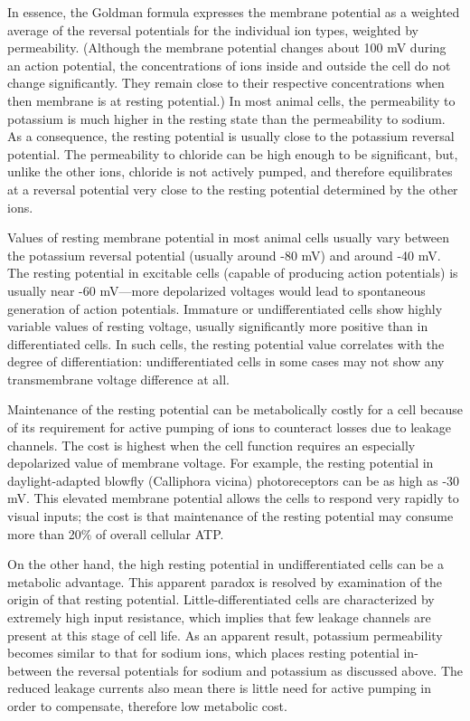 In essence, the Goldman formula expresses the membrane potential as a weighted average of the reversal potentials for the individual ion types, weighted by permeability. (Although the membrane potential changes about 100 mV during an action potential, the concentrations of ions inside and outside the cell do not change significantly. They remain close to their respective concentrations when then membrane is at resting potential.) In most animal cells, the permeability to potassium is much higher in the resting state than the permeability to sodium. As a consequence, the resting potential is usually close to the potassium reversal potential. The permeability to chloride can be high enough to be significant, but, unlike the other ions, chloride is not actively pumped, and therefore equilibrates at a reversal potential very close to the resting potential determined by the other ions.

Values of resting membrane potential in most animal cells usually vary between the potassium reversal potential (usually around -80 mV) and around -40 mV. The resting potential in excitable cells (capable of producing action potentials) is usually near -60 mV---more depolarized voltages would lead to spontaneous generation of action potentials. Immature or undifferentiated cells show highly variable values of resting voltage, usually significantly more positive than in differentiated cells. In such cells, the resting potential value correlates with the degree of differentiation: undifferentiated cells in some cases may not show any transmembrane voltage difference at all.

Maintenance of the resting potential can be metabolically costly for a cell because of its requirement for active pumping of ions to counteract losses due to leakage channels. The cost is highest when the cell function requires an especially depolarized value of membrane voltage. For example, the resting potential in daylight-adapted blowfly (Calliphora vicina) photoreceptors can be as high as -30 mV. This elevated membrane potential allows the cells to respond very rapidly to visual inputs; the cost is that maintenance of the resting potential may consume more than 20\% of overall cellular ATP.

On the other hand, the high resting potential in undifferentiated cells can be a metabolic advantage. This apparent paradox is resolved by examination of the origin of that resting potential. Little-differentiated cells are characterized by extremely high input resistance, which implies that few leakage channels are present at this stage of cell life. As an apparent result, potassium permeability becomes similar to that for sodium ions, which places resting potential in-between the reversal potentials for sodium and potassium as discussed above. The reduced leakage currents also mean there is little need for active pumping in order to compensate, therefore low metabolic cost.

